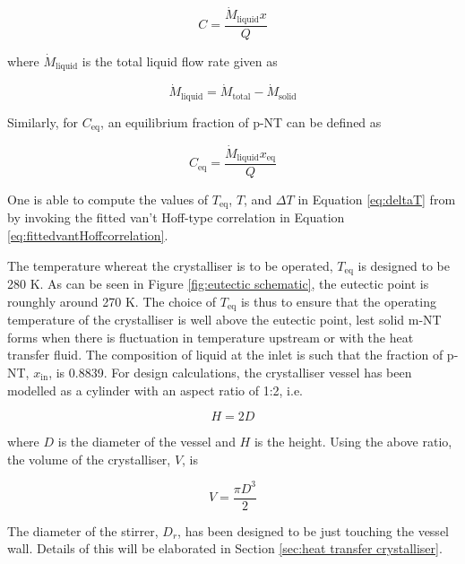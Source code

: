 \begin{equation}
    C = \frac{\dot{M}_{\mathrm{liquid}} x}{Q}
\end{equation}

\noindent where $\dot{M}_{\mathrm{liquid}}$ is the total liquid flow rate given as 

\begin{equation}
    \dot{M}_{\mathrm{liquid}} = \dot{M}_{\mathrm{total}} - \dot{M}_{\mathrm{solid}}
\end{equation}

\noindent Similarly, for $C_{\mathrm{eq}}$, an equilibrium fraction of p-NT can be defined as

\begin{equation}
    C_{\mathrm{eq}} = \frac{\dot{M}_{\mathrm{liquid}} x_{\mathrm{eq}}}{Q}
\end{equation}

\noindent One is able to compute the values of $T_{\mathrm{eq}}$, $T$, and $\Delta T$ in Equation \ref{eq:deltaT} from by invoking the fitted van't Hoff-type correlation in Equation \ref{eq:fittedvantHoffcorrelation}. 

The temperature whereat the crystalliser is to be operated, $T_{\mathrm{eq}}$ is designed to be 280 K. As can be seen in Figure \ref{fig:eutectic schematic}, the eutectic point is rounghly around 270 K. The choice of $T_{\mathrm{eq}}$ is thus to ensure that the operating temperature of the crystalliser is well above the eutectic point, lest solid m-NT forms when there is fluctuation in temperature upstream or with the heat transfer fluid. The composition of liquid at the inlet is such that the fraction of p-NT, $x_{\mathrm{in}}$, is 0.8839. For design calculations, the crystalliser vessel has been modelled as a cylinder with an aspect ratio of 1:2, i.e. 

\begin{equation}
    H = 2D
\end{equation}

\noindent where $D$ is the diameter of the vessel and $H$ is the height. Using the above ratio, the volume of the crystalliser, $V$, is

\begin{equation} \label{eq:crystalliser volume}
    V = \frac{\pi D^3}{2} 
\end{equation}

\noindent The diameter of the stirrer, $D_r$, has been designed to be just touching the vessel wall. Details of this will be elaborated in Section \ref{sec:heat transfer crystalliser}.

